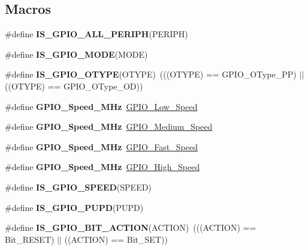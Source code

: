 \subsection*{Macros}
\begin{DoxyCompactItemize}
\item 
\#define {\bfseries I\+S\+\_\+\+G\+P\+I\+O\+\_\+\+A\+L\+L\+\_\+\+P\+E\+R\+I\+PH}(P\+E\+R\+I\+PH)
\item 
\#define {\bfseries I\+S\+\_\+\+G\+P\+I\+O\+\_\+\+M\+O\+DE}(M\+O\+DE)
\item 
\mbox{\label{group___g_p_i_o_ga7145550a414f2b0455d79ddde6100af8}} 
\#define {\bfseries I\+S\+\_\+\+G\+P\+I\+O\+\_\+\+O\+T\+Y\+PE}(O\+T\+Y\+PE)~(((O\+T\+Y\+PE) == G\+P\+I\+O\+\_\+\+O\+Type\+\_\+\+PP) $\vert$$\vert$ ((O\+T\+Y\+PE) == G\+P\+I\+O\+\_\+\+O\+Type\+\_\+\+OD))
\item 
\mbox{\label{group___g_p_i_o_ga59fcf2bf19043e8c793e57aa7cb7a365}} 
\#define {\bfseries G\+P\+I\+O\+\_\+\+Speed\+\_\+M\+Hz}~\mbox{\hyperlink{group___g_p_i_o_gga062ad92b67b4a1f301c161022cf3ba8ea898ec2036718768d42e79afcb95ce5bf}{G\+P\+I\+O\+\_\+\+Low\+\_\+\+Speed}}
\item 
\mbox{\label{group___g_p_i_o_ga5b5395a97e914df1cbc1061fae18e952}} 
\#define {\bfseries G\+P\+I\+O\+\_\+\+Speed\+\_\+M\+Hz}~\mbox{\hyperlink{group___g_p_i_o_gga062ad92b67b4a1f301c161022cf3ba8eaeed9485cfebba319947e3ef495e44371}{G\+P\+I\+O\+\_\+\+Medium\+\_\+\+Speed}}
\item 
\mbox{\label{group___g_p_i_o_ga1756d58bb94b39e36e564dc1e0b8b0e8}} 
\#define {\bfseries G\+P\+I\+O\+\_\+\+Speed\+\_\+M\+Hz}~\mbox{\hyperlink{group___g_p_i_o_gga062ad92b67b4a1f301c161022cf3ba8ea91731d092dedee851773cea4698662e6}{G\+P\+I\+O\+\_\+\+Fast\+\_\+\+Speed}}
\item 
\mbox{\label{group___g_p_i_o_ga7d6f553efe07beb4d231fbef1e133aa1}} 
\#define {\bfseries G\+P\+I\+O\+\_\+\+Speed\+\_\+M\+Hz}~\mbox{\hyperlink{group___g_p_i_o_gga062ad92b67b4a1f301c161022cf3ba8ea5b6a7186d45e9daebfc03b7a309162e8}{G\+P\+I\+O\+\_\+\+High\+\_\+\+Speed}}
\item 
\#define {\bfseries I\+S\+\_\+\+G\+P\+I\+O\+\_\+\+S\+P\+E\+ED}(S\+P\+E\+ED)
\item 
\#define {\bfseries I\+S\+\_\+\+G\+P\+I\+O\+\_\+\+P\+U\+PD}(P\+U\+PD)
\item 
\mbox{\label{group___g_p_i_o_ga6b882caa8ed9857c5c7267959a7818c5}} 
\#define {\bfseries I\+S\+\_\+\+G\+P\+I\+O\+\_\+\+B\+I\+T\+\_\+\+A\+C\+T\+I\+ON}(A\+C\+T\+I\+ON)~(((A\+C\+T\+I\+ON) == Bit\+\_\+\+R\+E\+S\+ET) $\vert$$\vert$ ((A\+C\+T\+I\+ON) == Bit\+\_\+\+S\+ET))
\end{DoxyCompactItemize}
